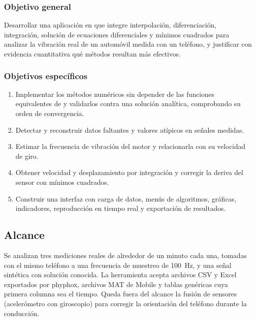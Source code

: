 \subsubsection{Objetivo general}
Desarrollar una aplicación en \matlab{} que integre interpolación, diferenciación, integración, solución de ecuaciones diferenciales y mínimos cuadrados para analizar la vibración real de un automóvil medida con un teléfono, y justificar con evidencia cuantitativa qué métodos resultan más efectivos.

\subsubsection{Objetivos específicos}
\begin{enumerate}
  \item Implementar los métodos numéricos sin depender de las funciones equivalentes de \matlab{} y validarlos contra una solución analítica, comprobando su orden de convergencia.
  \item Detectar y reconstruir datos faltantes y valores atípicos en señales medidas.
  \item Estimar la frecuencia de vibración del motor y relacionarla con su velocidad de giro.
  \item Obtener velocidad y desplazamiento por integración y corregir la deriva del sensor con mínimos cuadrados.
  \item Construir una interfaz con carga de datos, menús de algoritmos, gráficas, indicadores, reproducción en tiempo real y exportación de resultados.
\end{enumerate}

\subsection{Alcance}
Se analizan tres mediciones reales de alrededor de un minuto cada una, tomadas con el mismo teléfono a una frecuencia de muestreo de 100~Hz, y una señal sintética con solución conocida. La herramienta acepta archivos CSV y Excel exportados por phyphox, archivos MAT de \matlab{} Mobile y tablas genéricas cuya primera columna sea el tiempo. Queda fuera del alcance la fusión de sensores (acelerómetro con giroscopio) para corregir la orientación del teléfono durante la conducción.
